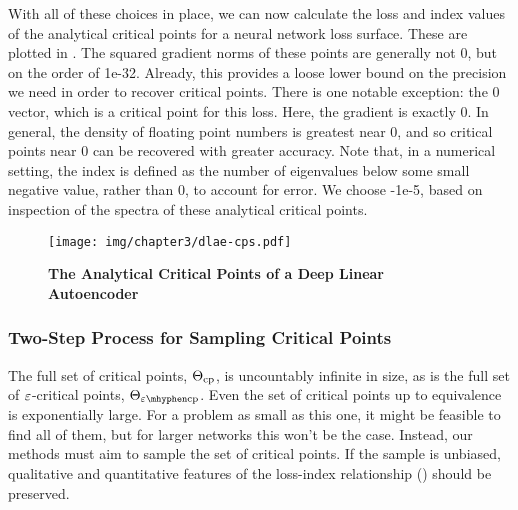 \documentclass[../../thesis.tex]{subfiles}
\begin{document}
With all of these choices in place,
we can now calculate the loss and index values of the analytical
critical points for a neural network loss surface.
These are plotted in .
The squared gradient norms of these points are generally not $0$,
but on the order of 1e-32.
Already, this provides a loose lower bound on the precision we need
in order to recover critical points.
There is one notable exception:
the $0$ vector, which is a critical point for this loss.
Here, the gradient is exactly $0$.
In general, the density of floating point numbers is greatest near $0$,
and so critical points near $0$ can be recovered with greater accuracy.
Note that, in a numerical setting,
the index is defined as the number of eigenvalues
below some small negative value, rather than $0$,
to account for error.
We choose -1e-5,
based on inspection of the spectra of these
analytical critical points.

\begin{figure}[h]
	\begin{center}
		\texttt{[image: img/chapter3/dlae-cps.pdf]}
	\end{center}
	\caption{\textbf{The Analytical Critical Points
	of a Deep Linear Autoencoder}}
\end{figure}

\subsubsection{Two-Step Process for Sampling Critical Points}%

The full set of critical points, $\Theta_{\mathrm{cp}}$,
is uncountably infinite in size,
as is the full set of $\varepsilon$-critical points,
$\Theta_{\ecp}$.
Even the set of critical points up to equivalence is exponentially large.
For a problem as small as this one, it might be feasible to find all of them,
but for larger networks this won't be the case.
Instead, our methods must aim to sample the set of critical points.
If the sample is unbiased, qualitative and quantitative features
of the loss-index relationship
()
should be preserved.
\end{document}
